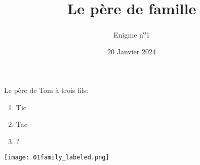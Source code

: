 \documentclass[a4paper, top=10mm]{article}
\title{\textbf{\huge{Le père de famille}}}
\author{Enigme n\textsuperscript{o}1}
\date{20 Janvier 2024}
\begin{document}
	\maketitle
	
	\huge
	Le père de Tom à trois fils:
	\begin{enumerate}
		\item Tic
		\item Tac
		\item ?
	\end{enumerate}

	\vspace{3cm}
	
	\begin{center}
		\texttt{[image: 01family\_labeled.png]}
	\end{center}
	
\end{document}
